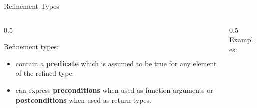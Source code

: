\documentclass[aspectratio=169]{beamer}
\begin{document}
\begin{frame}[fragile]{Refinement Types}

	\begin{columns}[T]
		\begin{column}{0.5\textwidth}

			Refinement types:

			\begin{itemize}
				\item contain a \textbf{predicate} which is assumed to be true for any element of the refined type.
				\item can express \textbf{preconditions} when used as function arguments or \textbf{postconditions} when used as return types.
			\end{itemize}
		\end{column}

		\begin{column}{0.5\textwidth}
			Examples:


		\end{column}
	\end{columns}

\end{frame}
\end{document}
